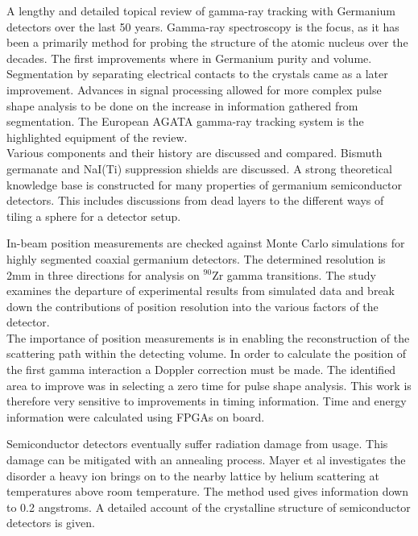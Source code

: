 \documentclass[12pt]{article}
\begin{document}
\begin{doublespacing}
{\large\textbf{\cite{Eberth2008283}}}
A lengthy and detailed topical review of gamma-ray tracking with Germanium detectors over the last 50 years.
Gamma-ray spectroscopy is the focus, as it has been a primarily method for probing the structure of the atomic nucleus over the decades.
The first improvements where in Germanium purity and volume.
Segmentation by separating electrical contacts to the crystals came as a later improvement.
Advances in signal processing allowed for more complex pulse shape analysis to be done on the increase in information gathered from segmentation.
The European AGATA gamma-ray tracking system is the highlighted equipment of the review.
\\

Various components and their history are discussed and compared.
Bismuth germanate and NaI(Ti) suppression shields are discussed.
A strong theoretical knowledge base is constructed for many properties of germanium semiconductor detectors.
This includes discussions from dead layers to the different ways of tiling a sphere for a detector setup.


{\large\textbf{\cite{Descovich2005535}}}
In-beam position measurements are checked against Monte Carlo simulations for highly segmented coaxial germanium detectors.
The determined resolution is 2mm in three directions for analysis on $^{90}\mbox{Zr}$ gamma transitions.
The study examines the departure of experimental results from simulated data and break down the contributions of position resolution into the various factors of the detector.
\\

The importance of position measurements is in enabling the reconstruction of the scattering path within the detecting volume.
In order to calculate the position of the first gamma interaction a Doppler correction must be made.
The identified area to improve was in selecting a zero time for pulse shape analysis.
This work is therefore very sensitive to improvements in timing information.
Time and energy information were calculated using FPGAs on board.


{\large\textbf{\cite{Mayer}}}
Semiconductor detectors eventually suffer radiation damage from usage.
This damage can be mitigated with an annealing process.
Mayer et al investigates the disorder a heavy ion brings on to the nearby lattice by helium scattering at temperatures above room temperature.
The method used gives information down to 0.2 angstroms.
A detailed account of the crystalline structure of semiconductor detectors is given.
\\


\end{doublespacing}
\end{document}
